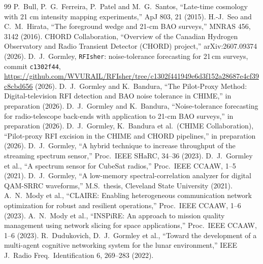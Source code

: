 \documentclass[12pt]{article}
\begin{document}
\begin{thebibliography}{99}
 P.~Bull, P.~G.~Ferreira, P.~Patel and M.~G.~Santos, ``Late-time cosmology with 21 cm intensity mapping experiments,'' ApJ 803, 21 (2015).
 H.-J.~Seo and C.~M.~Hirata, ``The foreground wedge and 21-cm BAO surveys,'' MNRAS 456, 3142 (2016).
 CHORD Collaboration, ``Overview of the Canadian Hydrogen Observatory and Radio Transient Detector (CHORD) project,'' arXiv:2607.09374 (2026).
 D.~J.~Gormley, \texttt{RFIsher}: noise-tolerance forecasting for 21\,cm surveys, commit \texttt{c1302f44}, \url{https://github.com/WVURAIL/RFIsher/tree/c1302f441949e6d3f152a28687e4cf39c8cbd656} (2026).
 D.~J.~Gormley and K.~Bandura, ``The Pilot-Proxy Method: Digital-television RFI detection and BAO noise tolerance in CHIME,'' in preparation (2026).
 D.~J.~Gormley and K.~Bandura, ``Noise-tolerance forecasting for radio-telescope back-ends with application to 21-cm BAO surveys,'' in preparation (2026).
 D.~J.~Gormley, K.~Bandura et al.\ (CHIME Collaboration), ``Pilot-proxy RFI excision in the CHIME and CHORD pipelines,'' in preparation (2026).
 D.~J.~Gormley, ``A hybrid technique to increase throughput of the streaming spectrum sensor,'' Proc.\ IEEE SHaRC, 34--36 (2023).
 D.~J.~Gormley et al., ``A spectrum sensor for CubeSat radios,'' Proc.\ IEEE CCAAW, 1--5 (2021).
 D.~J.~Gormley, ``A low-memory spectral-correlation analyzer for digital QAM-SRRC waveforms,'' M.S.\ thesis, Cleveland State University (2021).
 A.~N.~Mody et al., ``CLAIRE: Enabling heterogeneous communication network optimization for robust and resilient operations,'' Proc.\ IEEE CCAAW, 1--6 (2023).
 A.~N.~Mody et al., ``INSPiRE: An approach to mission quality management using network slicing for space applications,'' Proc.\ IEEE CCAAW, 1--6 (2023).
 R.~Dudukovich, D.~J.~Gormley et al., ``Toward the development of a multi-agent cognitive networking system for the lunar environment,'' IEEE J.\ Radio Freq.\ Identification 6, 269--283 (2022).
\end{thebibliography}
\end{document}
